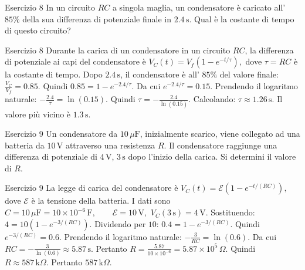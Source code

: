 \documentclass[a4paper]{article}
\begin{document}
\begin{snippetexercise}{Esercizio 8}
    In un circuito \(RC\) a singola maglia, un condensatore è caricato
    all' \(85\%\) della sua differenza di potenziale finale in
    \(2.4\,\mathrm{s}\). Qual è la costante di tempo di questo circuito?

\end{snippetexercise}
\begin{snippetsolution}{Esercizio 8}
    Durante la carica di un condensatore in un circuito \(RC\), la differenza
    di potenziale ai capi del condensatore è
    \(V_C(t) = V_f\left(1-e^{-t/\tau}\right),\)
    dove
    \(\tau = RC\)
    è la costante di tempo.
    Dopo \(2.4\,\mathrm{s}\), il condensatore è all' \(85\%\) del valore finale:
    \(\frac{V_C}{V_f} = 0.85.\)
    Quindi
    \(0.85 = 1 - e^{-2.4/\tau}.\)
    Da cui
    \(e^{-2.4/\tau} = 0.15.\)
    Prendendo il logaritmo naturale:
    \(-\frac{2.4}{\tau} = \ln(0.15).\)
    Quindi
    \(\tau = -\frac{2.4}{\ln(0.15)}.\)
    Calcolando:
    \(\tau \approx 1.26\,\mathrm{s}.\)
    Il valore più vicino è
    \(\boxed{1.3\,\mathrm{s}}.\)
\end{snippetsolution}
\begin{snippetexercise}{Esercizio 9}
    Un condensatore da \(10\,\mu\mathrm{F}\), inizialmente scarico, viene
    collegato ad una batteria da \(10\,\mathrm{V}\) attraverso una resistenza
    \(R\). Il condensatore raggiunge una differenza di potenziale di
    \(4\,\mathrm{V}\), \(3\,\mathrm{s}\) dopo l'inizio della carica.
    Si determini il valore di \(R\).

\end{snippetexercise}
\begin{snippetsolution}{Esercizio 9}
    La legge di carica del condensatore è
    \(V_C(t) = \mathcal{E} \left(1-e^{-t/(RC)}\right),\)
    dove \(\mathcal{E}\) è la tensione della batteria.
    I dati sono
    \(C = 10\,\mu\mathrm{F} = 10 \times 10^{-6}\,\mathrm{F}, \qquad \mathcal{E} = 10\,\mathrm{V},\)
    \(V_C(3\,\mathrm{s}) = 4\,\mathrm{V}.\)
    Sostituendo:
    \(4 = 10 \left(1-e^{-3/(RC)}\right).\)
    Dividendo per \(10\):
    \(0.4 = 1-e^{-3/(RC)}.\)
    Quindi
    \(e^{-3/(RC)} = 0.6.\)
    Prendendo il logaritmo naturale:
    \(-\frac{3}{RC} = \ln(0.6).\)
    Da cui
    \(RC = -\frac{3}{\ln(0.6)} \approx 5.87\,\mathrm{s}.\)
    Pertanto
    \(R = \frac{5.87}{10 \times 10^{-6}} = 5.87 \times 10^5\,\Omega.\)
    Quindi
    \(R \approx 587\,\mathrm{k}\Omega.\)
    Pertanto
    \(\boxed{587\,\mathrm{k}\Omega}.\)
\end{snippetsolution}
\end{document}
